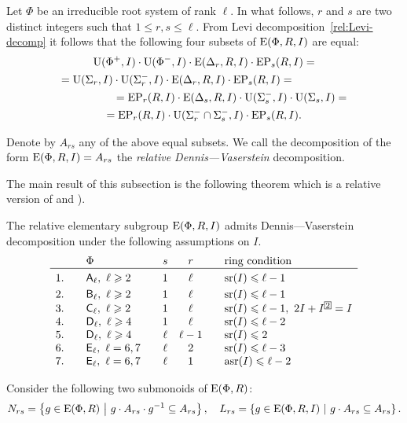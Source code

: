 Let $\Phi$ be an irreducible root system of rank $\ell$.
In what follows, $r$ and $s$ are two distinct integers such that $1 \leq r, s \leq \ell$.
From Levi decomposition~\ref{rel:Levi-decomp} it follows that the following four subsets of $\operatorname{E}(\Phi, R, I)$ are equal:
\begin{multline*}
\operatorname{U}(\Phi^+, I)\cdot \operatorname{U}(\Phi^-, I) \cdot \operatorname{E}(\Delta_r, R, I) \cdot \operatorname{EP}_s(R, I) = \\
= \operatorname{U}(\Sigma_r, I)\cdot \operatorname{U}(\Sigma^-_r, I) \cdot \operatorname{E}(\Delta_r, R, I) \cdot \operatorname{EP}_s(R, I) = \hspace{5em} \\
\hspace{5em} = \operatorname{EP}_r(R, I) \cdot \operatorname{E}(\Delta_s, R, I) \cdot \operatorname{U}(\Sigma_s^-, I)\cdot \operatorname{U}(\Sigma_s, I) = \\
= \operatorname{EP}_r(R, I) \cdot \operatorname{U}(\Sigma^-_r \cap \Sigma^-_s, I) \cdot \operatorname{EP}_s(R, I).
\end{multline*}

\begin{dfn}
 Denote by $A_{rs}$ any of the above equal subsets.
 We call the decomposition of the form $\operatorname{E}(\Phi, R, I) = A_{rs}$ the {\it relative Dennis---Vaserstein} decomposition.
\end{dfn}

The main result of this subsection is the following theorem which is a relative version of \cite[Lemma~2.1]{ST76} and \cite[Theorem~2.5]{St78}).
\begin{thm}\label{thm:DennisVaserstein}
The relative elementary subgroup $\operatorname{E}(\Phi, R, I)$ admits Dennis---Vaserstein decomposition under the following assumptions on $I$.
\[\begin{array}{l@{\qquad}l@{\qquad}c@{\quad}c@{\qquad}l}
   & \Phi                                 & s    & r      & \text{ring condition} \\ \hline\vphantom{\Bigl(}
1. & \rA_\ell,\ \ell\geqslant 2            & 1    & \ell   & \sr(I) \leqslant \ell-1                         \\    
2. & \rB_\ell,\ \ell\geqslant 2            & 1    & \ell   & \sr(I) \leqslant \ell-1                         \\
3. & \rC_\ell,\ \ell \geqslant 2          & 1    & \ell   & \sr(I) \leqslant \ell-1,\ 2I+I^{\indexbox{2}}=I \\
4. & \rD_\ell,\ \ell\geqslant 4           & 1    & \ell   & \sr(I) \leqslant \ell-2                         \\ 
5. & \rD_\ell,\ \ell\geqslant 4           & \ell & \ell-1 & \sr(I) \leqslant 2                              \\
6. & \rE_\ell,\ \ell=6,7                  & \ell & 2      & \sr(I) \leqslant \ell-3                         \\ 
7. & \rE_\ell,\ \ell=6,7                  & \ell & 1      & \asr(I)\leqslant \ell-2                         \end{array}\]
\end{thm}
Consider the following two submonoids of $\operatorname{E}(\Phi, R)$:
\[ N_{rs} = \left\{ g\in \operatorname{E}(\Phi, R)\ \middle|\ g \cdot A_{rs} \cdot g^{-1} \subseteq A_{rs} \right\}, \quad
   L_{rs}=  \left\{ g\in \operatorname{E}(\Phi, R, I)\ \middle|\ g \cdot A_{rs} \subseteq A_{rs} \right\}. \]

